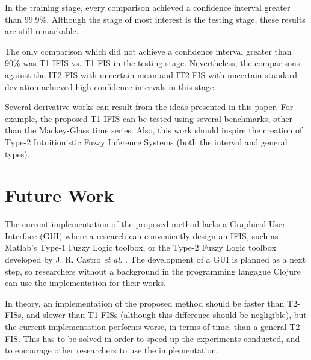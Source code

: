 \documentclass[conference]{IEEEtran}
\begin{document}
In the training stage, every comparison achieved a confidence interval
greater than 99.9\%. Although the stage of most interest is the
testing stage, these results are still remarkable.

The only comparison which did not achieve a confidence interval
greater than 90\% was T1-IFIS vs. T1-FIS in the testing
stage. Nevertheless, the comparisons against the IT2-FIS with
uncertain mean and IT2-FIS with uncertain standard deviation achieved
high confidence intervals in this stage.

Several derivative works can result from the ideas presented in this paper. For
example, the proposed T1-IFIS can be tested using several
benchmarks, other than the Mackey-Glass time series. Also, this work
should inspire the creation of Type-2 Intuitionistic Fuzzy Inference
Systems (both the interval and general types).

\section{Future Work}
\label{future-work}

The current implementation of the proposed method lacks a Graphical User
Interface (GUI) where a research can conveniently design an IFIS, such as
Matlab's Type-1 Fuzzy Logic toolbox, or the Type-2 Fuzzy Logic toolbox
developed by J. R. Castro \textit{et al.} \cite{castro2007interval}. The
development of a GUI is planned as a next step, so researchers without
a background in the programming langague Clojure can use the
implementation for their works.

In theory, an implementation of the proposed method should be faster
than T2-FISs, and slower than T1-FISs (although this difference should
be negligible), but the current implementation performs worse, in
terms of time, than a general T2-FIS. This has to be solved in order
to speed up the experiments conducted, and to encourage other
researchers to use the implementation.



\end{document}
